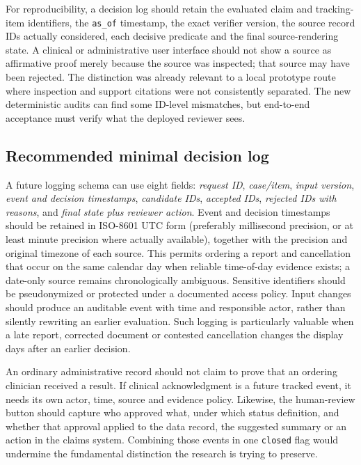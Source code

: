 \documentclass[11pt,twocolumn]{article}
\newcommand{\code}[1]{\texttt{#1}}
\begin{document}
For reproducibility, a decision log should retain the evaluated claim and tracking-item identifiers, the \code{as\_of} timestamp, the exact verifier version, the source record IDs actually considered, each decisive predicate and the final source-rendering state. A clinical or administrative user interface should not show a source as affirmative proof merely because the source was inspected; that source may have been rejected. The distinction was already relevant to a local prototype route where inspection and support citations were not consistently separated. The new deterministic audits can find some ID-level mismatches, but end-to-end acceptance must verify what the deployed reviewer sees.

\subsection{Recommended minimal decision log}
A future logging schema can use eight fields: \emph{request ID}, \emph{case/item}, \emph{input version}, \emph{event and decision timestamps}, \emph{candidate IDs}, \emph{accepted IDs}, \emph{rejected IDs with reasons}, and \emph{final state plus reviewer action}. Event and decision timestamps should be retained in \mbox{ISO-8601} UTC form (preferably millisecond precision, or at least minute precision where actually available), together with the precision and original timezone of each source. This permits ordering a report and cancellation that occur on the same calendar day when reliable time-of-day evidence exists; a date-only source remains chronologically ambiguous. Sensitive identifiers should be pseudonymized or protected under a documented access policy. Input changes should produce an auditable event with time and responsible actor, rather than silently rewriting an earlier evaluation. Such logging is particularly valuable when a late report, corrected document or contested cancellation changes the display days after an earlier decision.

An ordinary administrative record should not claim to prove that an ordering clinician received a result. If clinical acknowledgment is a future tracked event, it needs its own actor, time, source and evidence policy. Likewise, the human-review button should capture who approved what, under which status definition, and whether that approval applied to the data record, the suggested summary or an action in the claims system. Combining those events in one \code{closed} flag would undermine the fundamental distinction the research is trying to preserve.
\end{document}
